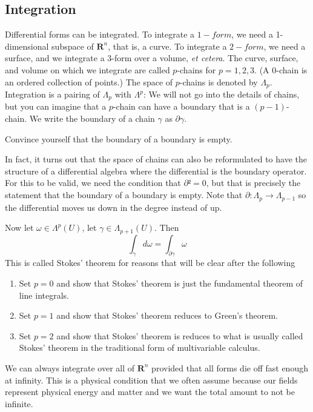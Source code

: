 \subsection{Integration}
Differential forms can be integrated. To integrate a $1-form$, we need a 1-dimensional subspace of $𝐑^n$, that is, a curve. To integrate a $2-form$, we need a surface, and we integrate a 3-form over a volume, {\it et cetera}. 
The curve, surface, and volume on which we integrate are called $p$-chains for $p=1,2,3$. (A 0-chain is an ordered collection of points.) The space of $p$-chains is denoted by $Λ_p$. Integration is a pairing of $Λ_p$ with $Λ^p$: 
We will not go into the details of chains, but you can imagine that a $p$-chain can have a boundary that is a $(p-1)$-chain. We write the boundary of a chain $γ$ as $∂γ$. 
\begin{exercise}
Convince yourself that the boundary of a boundary is empty.
\end{exercise}
In fact, it turns out that the space of chains can also be reformulated to have the structure of a differential algebra where the differential is the boundary operator. For this to be valid, we need the condition that $∂² = 0$, but that is precisely the statement that the boundary of a boundary is empty. Note that $∂ : Λ_p → Λ_{p-1}$ so the differential moves us down in the degree instead of up. 

Now let $ω ∈ Λ^p (U)$, let $γ∈ Λ_{p+1}(U)$. Then
$$
 ∫_γ dω = ∫_{∂γ} ω 
$$ 
This is called Stokes' theorem for reasons that will be clear after the following
\begin{exercise}
\begin{enumerate}
\item Set $p=0$ and show that Stokes' theorem is just the fundamental theorem of line integrals.
\item Set $p=1$ and show that Stokes' theorem reduces to Green's theorem.
\item Set $p=2$ and show that Stokes' theorem is reduces to what is usually called Stokes' theorem in the traditional form of multivariable calculus.
\end{enumerate}
\end{exercise}

We can always integrate over all of $𝐑^n$ provided that all forms die off fast enough at infinity. This is a physical condition that we often assume because our fields represent physical energy and matter and we want the total amount to not be infinite. 

